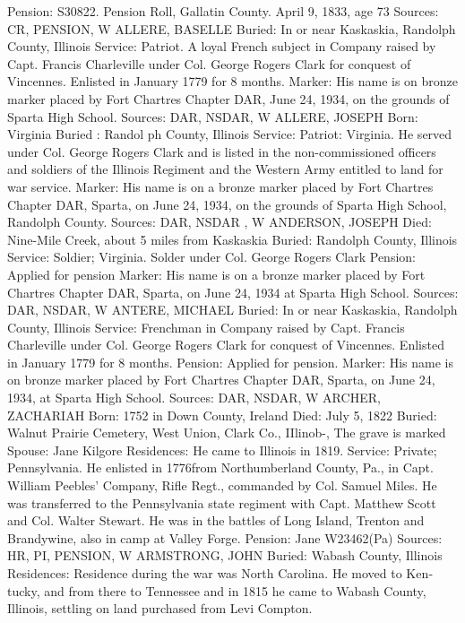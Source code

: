 Pension: S30822. Pension Roll, Gallatin County. April 9, 1833, age 73 
Sources: CR, PENSION, W 
ALLERE, BASELLE 
Buried: In or near Kaskaskia, Randolph County, Illinois 
Service: Patriot. A loyal French subject in Company raised by Capt. Francis Charleville under Col. George Rogers Clark for conquest of Vincennes. En­listed in January 1779 for 8 months. 
Marker: His name is on bronze marker placed by Fort Chartres Chapter DAR, June 24, 1934, on the grounds of Sparta High School. 
Sources: DAR, NSDAR, W 
ALLERE, JOSEPH 
Born: Virginia Buried : Randol ph County, Illinois 
Service: Patriot: Virginia. He served under Col. George Rogers Clark and is listed in the non-commissioned officers and soldiers of the Illinois Regiment and the Western Army entitled to land for war service. 
Marker: His name is on a bronze marker placed by Fort Chartres Chapter DAR, Sparta, on June 24, 1934, on the grounds of Sparta High School, Randolph County. 
Sources: DAR, NSDAR , W 
ANDERSON, JOSEPH 
Died: Nine-Mile Creek, about 5 miles from Kaskaskia 
Buried: Randolph County, Illinois 
Service: Soldier; Virginia. Solder under Col. George Rogers Clark 
Pension: Applied for pension 
Marker: His name is on a bronze marker placed by Fort Chartres Chapter DAR, Sparta, on June 24, 1934 at Sparta High School. 
Sources: DAR, NSDAR, W 
ANTERE, MICHAEL 
Buried: In or near Kaskaskia, Randolph County, Illinois 
Service: Frenchman in Company raised by Capt. Francis Charleville under Col. George Rogers Clark for conquest of Vincennes. Enlisted in January 1779 for 8 months. 
Pension: Applied for pension. 
Marker: His name is on bronze marker placed by Fort Chartres Chapter DAR, Sparta, on June 24, 1934, at Sparta High School. 
Sources: DAR, NSDAR, W 
ARCHER, ZACHARIAH 
Born: 1752 in Down County, Ireland 
Died: July 5, 1822 
Buried: Walnut Prairie Cemetery, West Union, Clark Co., IIlinob-, The grave is marked 
Spouse: Jane Kilgore 
Residences: He came to Illinois in 1819. 
Service: Private; Pennsylvania. He enlisted in 1776from Northumberland County, Pa., in Capt. William Peebles' Company, Rifle Regt., commanded by Col. Samuel Miles. He was transferred to the Pennsylvania state regiment with Capt. Matthew Scott and Col. Walter Stewart. He was in the battles of Long Island, Trenton and Brandywine, also in camp at Valley Forge. 
Pension: Jane W23462(Pa) 
Sources: HR, PI, PENSION, W 
ARMSTRONG, JOHN 
Buried: Wabash County, Illinois 
Residences: Residence during the war was North Carolina. He moved to Ken­tucky, and from there to Tennessee and in 1815 he came to Wabash County, Illinois, settling on land purchased from Levi Compton. 
